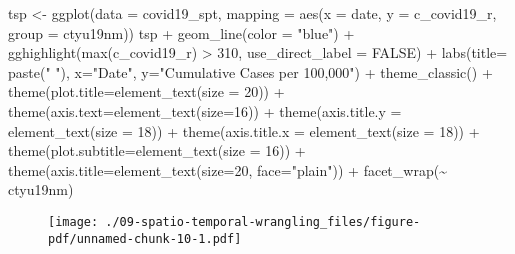 \documentclass[
  letterpaper,
  krantz2]{style/krantz}
\newenvironment{Shaded}{\begin{snugshade}}{\end{snugshade}}
\newcommand{\AttributeTok}[1]{\textcolor[rgb]{0.40,0.45,0.13}{#1}}
\newcommand{\ConstantTok}[1]{\textcolor[rgb]{0.56,0.35,0.01}{#1}}
\newcommand{\DecValTok}[1]{\textcolor[rgb]{0.68,0.00,0.00}{#1}}
\newcommand{\FunctionTok}[1]{\textcolor[rgb]{0.28,0.35,0.67}{#1}}
\newcommand{\NormalTok}[1]{\textcolor[rgb]{0.00,0.23,0.31}{#1}}
\newcommand{\OtherTok}[1]{\textcolor[rgb]{0.00,0.23,0.31}{#1}}
\newcommand{\SpecialCharTok}[1]{\textcolor[rgb]{0.37,0.37,0.37}{#1}}
\newcommand{\StringTok}[1]{\textcolor[rgb]{0.13,0.47,0.30}{#1}}
\begin{document}
\begin{Shaded}
\begin{Highlighting}[]
\NormalTok{tsp }\OtherTok{\textless{}{-}} \FunctionTok{ggplot}\NormalTok{(}\AttributeTok{data =}\NormalTok{ covid19\_spt,}
            \AttributeTok{mapping =} \FunctionTok{aes}\NormalTok{(}\AttributeTok{x =}\NormalTok{ date, }\AttributeTok{y =}\NormalTok{ c\_covid19\_r,}
                          \AttributeTok{group =}\NormalTok{ ctyu19nm))}
\NormalTok{tsp }\SpecialCharTok{+} \FunctionTok{geom\_line}\NormalTok{(}\AttributeTok{color =} \StringTok{"blue"}\NormalTok{) }\SpecialCharTok{+} 
    \FunctionTok{gghighlight}\NormalTok{(}\FunctionTok{max}\NormalTok{(c\_covid19\_r) }\SpecialCharTok{\textgreater{}} \DecValTok{310}\NormalTok{, }\AttributeTok{use\_direct\_label =} \ConstantTok{FALSE}\NormalTok{) }\SpecialCharTok{+}
    \FunctionTok{labs}\NormalTok{(}\AttributeTok{title=} \FunctionTok{paste}\NormalTok{(}\StringTok{" "}\NormalTok{), }\AttributeTok{x=}\StringTok{"Date"}\NormalTok{, }\AttributeTok{y=}\StringTok{"Cumulative Cases per 100,000"}\NormalTok{) }\SpecialCharTok{+}
    \FunctionTok{theme\_classic}\NormalTok{() }\SpecialCharTok{+}
    \FunctionTok{theme}\NormalTok{(}\AttributeTok{plot.title=}\FunctionTok{element\_text}\NormalTok{(}\AttributeTok{size =} \DecValTok{20}\NormalTok{)) }\SpecialCharTok{+}
    \FunctionTok{theme}\NormalTok{(}\AttributeTok{axis.text=}\FunctionTok{element\_text}\NormalTok{(}\AttributeTok{size=}\DecValTok{16}\NormalTok{)) }\SpecialCharTok{+}
    \FunctionTok{theme}\NormalTok{(}\AttributeTok{axis.title.y =} \FunctionTok{element\_text}\NormalTok{(}\AttributeTok{size =} \DecValTok{18}\NormalTok{)) }\SpecialCharTok{+}
    \FunctionTok{theme}\NormalTok{(}\AttributeTok{axis.title.x =} \FunctionTok{element\_text}\NormalTok{(}\AttributeTok{size =} \DecValTok{18}\NormalTok{)) }\SpecialCharTok{+}
    \FunctionTok{theme}\NormalTok{(}\AttributeTok{plot.subtitle=}\FunctionTok{element\_text}\NormalTok{(}\AttributeTok{size =} \DecValTok{16}\NormalTok{)) }\SpecialCharTok{+}
    \FunctionTok{theme}\NormalTok{(}\AttributeTok{axis.title=}\FunctionTok{element\_text}\NormalTok{(}\AttributeTok{size=}\DecValTok{20}\NormalTok{, }\AttributeTok{face=}\StringTok{"plain"}\NormalTok{)) }\SpecialCharTok{+}
    \FunctionTok{facet\_wrap}\NormalTok{(}\SpecialCharTok{\textasciitilde{}}\NormalTok{ ctyu19nm)}
\end{Highlighting}
\end{Shaded}

\begin{figure}[H]

{\centering \texttt{[image: ./09-spatio-temporal-wrangling\_files/figure-pdf/unnamed-chunk-10-1.pdf]}

}

\end{figure}
\end{document}
